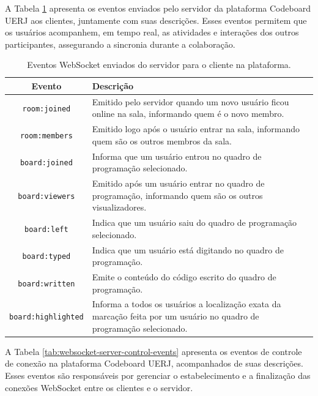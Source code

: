 A Tabela \ref{tab:websocket-server-to-client-events} apresenta os eventos enviados pelo servidor da plataforma Codeboard UERJ aos clientes, juntamente com suas descrições. Esses eventos permitem que os usuários acompanhem, em tempo real, as atividades e interações dos outros participantes, assegurando a sincronia durante a colaboração.

\begin{table}[H]
    \centering
    \renewcommand{\arraystretch}{1.3} 
    \begin{tabular}{|c|p{10cm}|}
        \hline
        \textbf{Evento} & \textbf{Descrição} \\
        \hline
        \texttt{room:joined} & Emitido pelo servidor quando um novo usuário ficou online na sala, informando quem é o novo membro. \\
        \hline
        \texttt{room:members} & Emitido logo após o usuário entrar na sala, informando quem são os outros membros da sala. \\
        \hline
        \texttt{board:joined} & Informa que um usuário entrou no quadro de programação selecionado. \\
        \hline
        \texttt{board:viewers} & Emitido após um usuário entrar no quadro de programação, informando quem são os outros visualizadores. \\
        \hline
        \texttt{board:left} & Indica que um usuário saiu do quadro de programação selecionado. \\
        \hline
        \texttt{board:typed} & Indica que um usuário está digitando no quadro de programação. \\
        \hline
        \texttt{board:written} & Emite o conteúdo do código escrito do quadro de programação. \\
        \hline
        \texttt{board:highlighted} & Informa a todos os usuários a localização exata da marcação feita por um usuário no quadro de programação selecionado. \\
        \hline
    \end{tabular}
    \caption{Eventos WebSocket enviados do servidor para o cliente na plataforma.}
    \label{tab:websocket-server-to-client-events}
\end{table}

A Tabela \ref{tab:websocket-server-control-events} apresenta os eventos de controle de conexão na plataforma Codeboard UERJ, acompanhados de suas descrições. Esses eventos são responsáveis por gerenciar o estabelecimento e a finalização das conexões WebSocket entre os clientes e o servidor.

